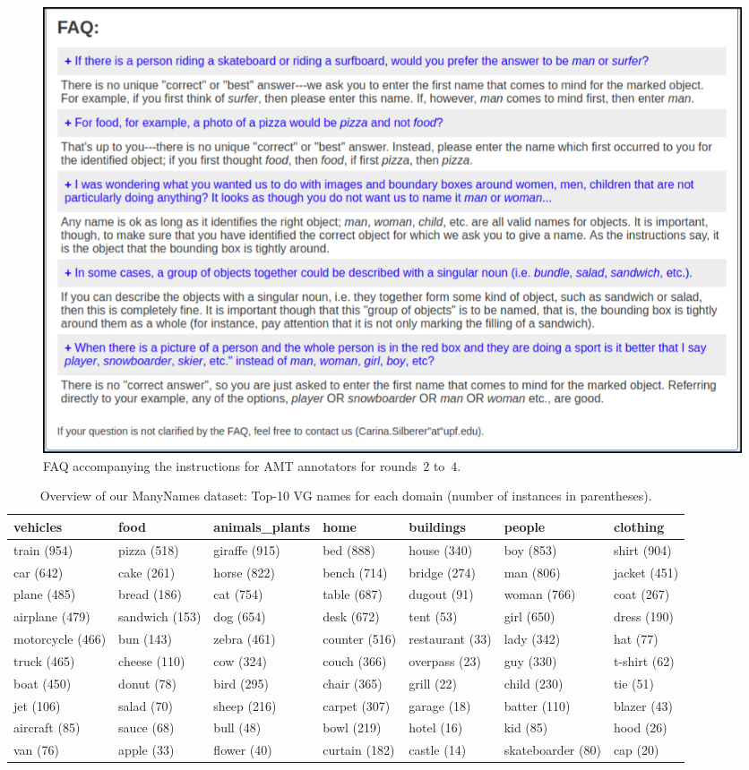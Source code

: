 \documentclass[11pt,a4paper]{article}
\begin{document}
\begin{figure}[htb]
  \centering
  \includegraphics[width=1.5\columnwidth]{figures/round1+_p2.png}
  \caption{FAQ accompanying the instructions for AMT annotators for rounds~$2$ to~$4$.}
  \label{fig:faq}
\end{figure}

\begin{table}
	\small
	\centering
\begin{tabular}{@{~}l@{~}l@{~}l@{~}l@{~}l@{~}l@{~}l}
	\toprule
	          vehicles &            food & animals\_plants &           home &        buildings &             people &      clothing \\
	\midrule
	  train (954) &  pizza (518) &  giraffe (915) &  bed (888) &  house (340) &  boy (853) &  shirt (904) \\
	  car (642) &  cake (261) &  horse (822) &  bench (714) &  bridge (274) &  man (806) &  jacket (451) \\
	  plane (485) &  bread (186) &  cat (754) &  table (687) &  dugout (91) &  woman (766) &  coat (267) \\
	  airplane (479) &  sandwich (153) &  dog (654) &  desk (672) &  tent (53) &  girl (650) &  dress (190) \\
	  motorcycle (466) &  bun (143) &  zebra (461) &  counter (516) &  restaurant (33) &  lady (342) &  hat (77) \\
	  truck (465) &  cheese (110) &  cow (324) &  couch (366) &  overpass (23) &  guy (330) &  t-shirt (62) \\
	 boat (450) &  donut (78) &  bird (295) &  chair (365) &  grill (22) &  child (230) &  tie (51) \\
	  jet (106) &  salad (70) &  sheep (216) &  carpet (307) &  garage (18) &  batter (110) &  blazer (43) \\
	  aircraft (85) &  sauce (68) &  bull (48) &  bowl (219) &  hotel (16) &  kid (85) &  hood (26) \\
	  van (76) &  apple (33) &  flower (40) &  curtain (182) &  castle (14) &  skateboarder (80) &  cap (20) \\
	\bottomrule
\end{tabular}
	\caption{Overview of our ManyNames dataset: Top-10 VG names for each domain (number of instances in parentheses). %
		 \label{tab:overview_dataset1}}
\end{table}
\end{document}
